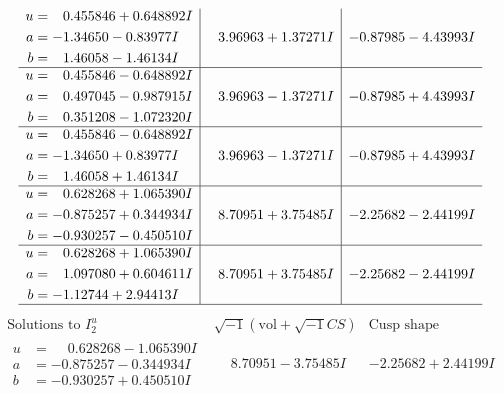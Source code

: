 \documentclass[1p]{elsarticle_modified}
\theoremstyle{definition}
\newcommand{\I}{\sqrt{-1}}
\begin{document}
$$\begin{array}{c|c|c}
\begin{aligned}
u &= \phantom{-}0.455846 + 0.648892 I \\
a &= -1.34650 - 0.83977 I \\
b &= \phantom{-}1.46058 - 1.46134 I\end{aligned}
 & \phantom{-}3.96963 + 1.37271 I & -0.87985 - 4.43993 I \\ \hline\begin{aligned}
u &= \phantom{-}0.455846 - 0.648892 I \\
a &= \phantom{-}0.497045 - 0.987915 I \\
b &= \phantom{-}0.351208 - 1.072320 I\end{aligned}
 & \phantom{-}3.96963 - 1.37271 I & -0.87985 + 4.43993 I \\ \hline\begin{aligned}
u &= \phantom{-}0.455846 - 0.648892 I \\
a &= -1.34650 + 0.83977 I \\
b &= \phantom{-}1.46058 + 1.46134 I\end{aligned}
 & \phantom{-}3.96963 - 1.37271 I & -0.87985 + 4.43993 I \\ \hline\begin{aligned}
u &= \phantom{-}0.628268 + 1.065390 I \\
a &= -0.875257 + 0.344934 I \\
b &= -0.930257 - 0.450510 I\end{aligned}
 & \phantom{-}8.70951 + 3.75485 I & -2.25682 - 2.44199 I \\ \hline\begin{aligned}
u &= \phantom{-}0.628268 + 1.065390 I \\
a &= \phantom{-}1.097080 + 0.604611 I \\
b &= -1.12744 + 2.94413 I\end{aligned}
 & \phantom{-}8.70951 + 3.75485 I & -2.25682 - 2.44199 I\\
 \hline 
 \end{array}$$\newpage$$\begin{array}{c|c|c}  
\text{Solutions to }I^u_{2}& \I (\text{vol} + \sqrt{-1}CS) & \text{Cusp shape}\\
 \hline 
\begin{aligned}
u &= \phantom{-}0.628268 - 1.065390 I \\
a &= -0.875257 - 0.344934 I \\
b &= -0.930257 + 0.450510 I\end{aligned}
 & \phantom{-}8.70951 - 3.75485 I & -2.25682 + 2.44199 I \\ \hline\begin{aligned}

\end{aligned}
\end{array}$$
\end{document}
